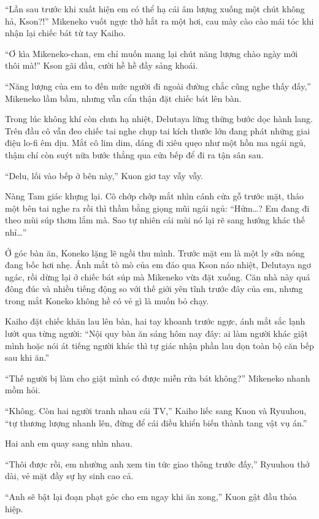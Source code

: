 ﻿\documentclass[../main.tex]{subfiles}
\begin{document}
``Lần sau trước khi xuất hiện em có thể hạ cái âm lượng xuống một chút không hả, Kson?!'' Mikeneko vuốt ngực thở hắt ra một hơi, cau mày cào cào mái tóc khi nhận lại chiếc bát từ tay Kaiho.

``Ơ kìa Mikeneko-chan, em chỉ muốn mang lại chút năng lượng chào ngày mới thôi mà!'' Kson gãi đầu, cười hề hề đầy sảng khoái.

``Năng lượng của em to đến mức người đi ngoài đường chắc cũng nghe thấy đấy,'' Mikeneko lầm bầm, nhưng vẫn cẩn thận đặt chiếc bát lên bàn.

Trong lúc không khí còn chưa hạ nhiệt, Delutaya lững thững bước dọc hành lang. Trên đầu cô vẫn đeo chiếc tai nghe chụp tai kích thước lớn đang phát những giai điệu lo-fi êm dịu. Mắt cô lim dim, dáng đi xiêu quẹo như một hồn ma ngái ngủ, thậm chí còn suýt nữa bước thẳng qua cửa bếp để đi ra tận sân sau.

``Delu, lối vào bếp ở bên này,'' Kuon giơ tay vẫy vẫy.

Nàng Tam giác khựng lại. Cô chớp chớp mắt nhìn cánh cửa gỗ trước mặt, tháo một bên tai nghe ra rồi thì thầm bằng giọng mũi ngái ngủ: ``Hửm\dots? Em đang đi theo mùi súp thơm lắm mà. Sao tự nhiên cái mùi nó lại rẽ sang hướng khác thế nhỉ\dots''

Ở góc bàn ăn, Koneko lặng lẽ ngồi thu mình. Trước mặt em là một ly sữa nóng đang bốc hơi nhẹ. Ánh mắt tò mò của em đảo qua Kson náo nhiệt, Delutaya ngơ ngác, rồi dừng lại ở chiếc bát súp mà Mikeneko vừa đặt xuống. Căn nhà này quá đông đúc và nhiều tiếng động so với thế giới yên tĩnh trước đây của em, nhưng trong mắt Koneko không hề có vẻ gì là muốn bỏ chạy.

Kaiho đặt chiếc khăn lau lên bàn, hai tay khoanh trước ngực, ánh mắt sắc lạnh lướt qua từng người: ``Nội quy bàn ăn sáng hôm nay đây: ai làm người khác giật mình hoặc nói át tiếng người khác thì tự giác nhận phần lau dọn toàn bộ căn bếp sau khi ăn.''

``Thế người bị làm cho giật mình có được miễn rửa bát không?'' Mikeneko nhanh mồm hỏi.

``Không. Còn hai người tranh nhau cái TV,'' Kaiho liếc sang Kuon và Ryuuhou, ``tự thương lượng nhanh lên, đừng để cái điều khiển biến thành tang vật vụ án.''

Hai anh em quay sang nhìn nhau.

``Thôi được rồi, em nhường anh xem tin tức giao thông trước đấy,'' Ryuuhou thở dài, vẻ mặt đầy sự hy sinh cao cả.

``Anh sẽ bật lại đoạn phạt góc cho em ngay khi ăn xong,'' Kuon gật đầu thỏa hiệp.
\end{document}
